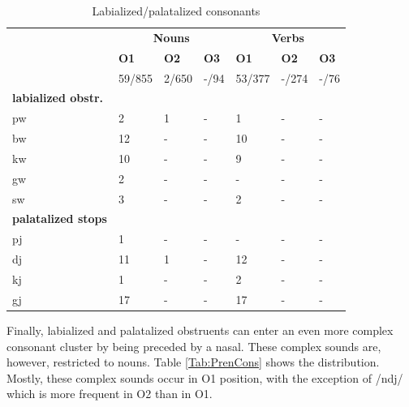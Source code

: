 \begin{table}
\centering
\begin{tabular}{l|lll|lll}
 \midrule
  &  \multicolumn{3}{c|}{\bfseries Nouns} &  \multicolumn{3}{c}{\bfseries Verbs} \\
 & {\bfseries O1} & {\bfseries O2} & {\bfseries O3} &  {\bfseries O1} & {\bfseries O2} & {\bfseries O3}   \\ 
                               & 59/855   & 2/650 & -/94 & 53/377 & -/274 &  -/76 \\  \midrule
{\bfseries labialized obstr.}  & & & & & &  \\
                        pw &     2 & 1  &  - & 1 & - & - \\
                        bw  &   12 &  - & - & 10 & - & -    \\
                        kw   & 10  &  -  & - & 9 & - & -   \\
                        gw	&   2  & -  & - & - & -  & -    \\ 
                        sw   &   3  & - & - &  2 & -  & -    \\  \midrule
{\bfseries palatalized stops}  &  &  &  & &    \\
                           pj & 1  & -  &  - & - & - & -    \\
                           dj &  11  & 1 & - &   12 & - & -   \\
                           kj &     1 & - & - &  2 & - & -  \\
                           gj &   17 & -  & - & 17 & - & -  \\
 \midrule
\end{tabular}
\caption{Labialized/palatalized consonants}
\label{Tab:LabCons}
\end{table}

Finally, labialized and palatalized obstruents can enter an even more complex consonant cluster by being preceded by a nasal. These complex sounds are, however, restricted to nouns. Table \ref{Tab:PrenCons} shows the distribution. Mostly, these complex sounds occur in O1 position, with the exception of /ndj/ which is more frequent in O2 than in O1.

